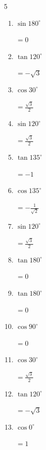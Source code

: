 \begin{multicols}{5}
\begin{enumerate}
        $\displaystyle なし$

  \item $\displaystyle \sin{180^\circ}$

        $\displaystyle =0$

  \item $\displaystyle \tan{120^\circ}$

        $\displaystyle =-\sqrt{3}$

  \item $\displaystyle \cos{30^\circ}$

        $\displaystyle =\frac{\sqrt{3}}{2}$

  \item $\displaystyle \sin{120^\circ}$

        $\displaystyle =\frac{\sqrt{3}}{2}$

  \item $\displaystyle \tan{135^\circ}$

        $\displaystyle =-1$

  \item $\displaystyle \cos{135^\circ}$

        $\displaystyle =-\frac{1}{\sqrt{2}}$

  \item $\displaystyle \sin{120^\circ}$

        $\displaystyle =\frac{\sqrt{3}}{2}$

  \item $\displaystyle \tan{180^\circ}$

        $\displaystyle =0$

  \item $\displaystyle \tan{180^\circ}$

        $\displaystyle =0$

  \item $\displaystyle \cos{90^\circ}$

        $\displaystyle =0$

  \item $\displaystyle \cos{30^\circ}$

        $\displaystyle =\frac{\sqrt{3}}{2}$

  \item $\displaystyle \tan{120^\circ}$

        $\displaystyle =-\sqrt{3}$

  \item $\displaystyle \cos{0^\circ}$

        $\displaystyle =1$


\end{enumerate}
\end{multicols}
